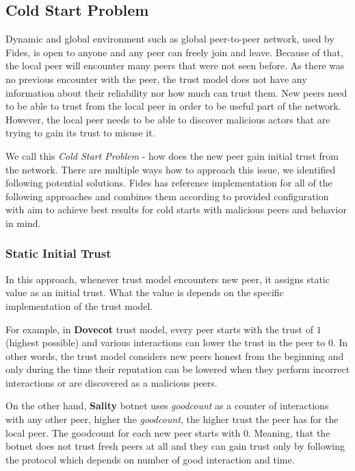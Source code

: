\subsection{Cold Start Problem}
\label{subsec:cold-start-problem}
Dynamic and global environment such as global peer-to-peer network, used by Fides, is open to anyone and any peer can freely join and leave. Because of that, the local peer will encounter many peers that were not seen before. As there was no previous encounter with the peer, the trust model does not have any information about their reliability nor how much can trust them. 
New peers need to be able to trust from the local peer in order to be useful part of the network. However, the local peer needs to be able to discover malicious actors that are trying to gain its trust to misuse it. 

We call this \textit{Cold Start Problem} - how does the new peer gain initial trust from the network. There are multiple ways how to approach this issue, we identified following potential solutions. 
Fides has reference implementation for all of the following approaches and combines them according to provided configuration with aim to achieve best results for cold starts with malicious peers and behavior in mind.

\subsubsection{Static Initial Trust}
\label{subsubsec:static-initial-trust}
In this approach, whenever trust model encounters new peer, it assigns static value as an initial trust. What the value is depends on the specific implementation of the trust model.

For example, in \textbf{Dovecot} trust model, every peer starts with the trust of $1$ (highest possible) and various interactions can lower the trust in the peer to $0$. In other words, the trust model considers new peers honest from the beginning and only during the time their reputation can be lowered when they perform incorrect interactions or are discovered as a malicious peers.

On the other hand, \textbf{Sality} botnet uses \textit{goodcount} as a counter of interactions with any other peer, higher the \textit{goodcount}, the higher trust the peer has for the local peer. The goodcount for each new peer starts with $0$. Meaning, that the botnet does not trust fresh peers at all and they can gain trust only by following the protocol which depends on number of good interaction and time.


